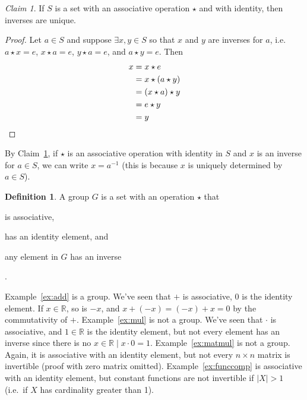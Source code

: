 \documentclass[12pt,letterpaper,DIV=11,final]{scrartcl}
\theoremstyle{plain}
\theoremstyle{definition}
\newtheorem{definition}{Definition}[section]
\theoremstyle{remark}
\newtheorem{claim}{Claim}
\begin{document}
\begin{claim}\label{claim:uniqueinverse}
  If $S$ is a set with an associative operation $\star$ and with identity, then inverses are unique.

  \begin{proof}
    Let $a \in S$ and suppose $\exists x, y \in S$ so that $x$ and $y$ are inverses for $a$, i.e. $a \star x = e$, $x \star a = e$, $y \star a = e$, and $a \star y = e$.
    Then
    \begin{align*}
      x &= x \star e \\
        &= x \star (a \star y) \\
        &= (x \star a) \star y \\
        &= e \star y \\
        &= y \qedhere
    \end{align*}
  \end{proof}
\end{claim}

By Claim~\ref{claim:uniqueinverse}, if $\star$ is an associative operation with identity in $S$ and $x$ is an inverse for $a \in S$, we can write $x = a^{-1}$
(this is because $x$ is uniquely determined by $a \in S$).

\begin{definition}
  A group $G$ is a set with an operation $\star$ that \begin{inlineenumi} \item is associative, \item has an identity element, and \item any element in $G$ has an inverse\end{inlineenumi}.
\end{definition}

Example~\ref{ex:add} is a group.
We've seen that $+$ is associative, 0 is the identity element. If $x \in \mathbb{R}$, so is $-x$, and $x + (-x) = (-x) + x = 0$ by the commutativity of $+$.
Example~\ref{ex:mul} is not a group.
We've seen that $\cdot$ is associative, and $1 \in \mathbb{R}$ is the identity element, but not every element has an inverse since there is no $x \in \mathbb{R} \mid x \cdot 0 = 1$.
Example~\ref{ex:matmul} is not a group.
Again, it is associative with an identity element, but not every $n \times n$ matrix is invertible (proof with zero matrix omitted).
Example~\ref{ex:funccomp} is associative with an identity element, but constant functions are not invertible if $|X| > 1$ (i.e.\ if $X$ has cardinality greater than 1).
\end{document}
